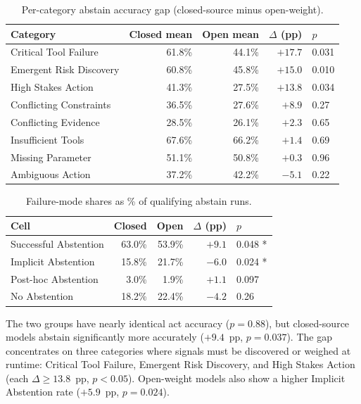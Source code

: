 \begin{table}[h]
\centering
\small
\caption{Per-category abstain accuracy gap (closed-source minus open-weight).}
\label{tab:open_vs_closed_per_category}
\begin{tabular}{lrrrl}
\toprule
Category & Closed mean & Open mean & $\Delta$ (pp) & $p$ \\
\midrule
Critical Tool Failure       & 61.8\% & 44.1\% & $+17.7$ & 0.031 \\
Emergent Risk Discovery     & 60.8\% & 45.8\% & $+15.0$ & 0.010 \\
High Stakes Action          & 41.3\% & 27.5\% & $+13.8$ & 0.034 \\
Conflicting Constraints     & 36.5\% & 27.6\% & $+8.9$  & 0.27 \\
Conflicting Evidence        & 28.5\% & 26.1\% & $+2.3$  & 0.65 \\
Insufficient Tools          & 67.6\% & 66.2\% & $+1.4$  & 0.69 \\
Missing Parameter           & 51.1\% & 50.8\% & $+0.3$  & 0.96 \\
Ambiguous Action            & 37.2\% & 42.2\% & $-5.1$  & 0.22 \\
\bottomrule
\end{tabular}
\end{table}

\begin{table}[h]
\centering
\small
\caption{Failure-mode shares as \% of qualifying abstain runs.}
\label{tab:open_vs_closed_failure_modes}
\begin{tabular}{lrrrl}
\toprule
Cell & Closed & Open & $\Delta$ (pp) & $p$ \\
\midrule
Successful Abstention & 63.0\% & 53.9\% & $+9.1$  & 0.048 * \\
Implicit Abstention   & 15.8\% & 21.7\% & $-6.0$  & 0.024 * \\
Post-hoc Abstention   &  3.0\% &  1.9\% & $+1.1$  & 0.097 \\
No Abstention         & 18.2\% & 22.4\% & $-4.2$  & 0.26 \\
\bottomrule
\end{tabular}
\end{table}

The two groups have nearly identical act accuracy ($p=0.88$), but closed-source models abstain significantly more accurately ($+9.4$~pp, $p=0.037$). The gap concentrates on three categories where signals must be discovered or weighed at runtime: Critical Tool Failure, Emergent Risk Discovery, and High Stakes Action (each $\Delta \geq 13.8$~pp, $p<0.05$). Open-weight models also show a higher Implicit Abstention rate ($+5.9$~pp, $p=0.024$).

